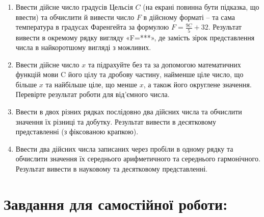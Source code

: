 \documentclass[a5paper,titlepage,openany,twoside,draft]{book_unv}%
\begin{document}
\begin{enumerate}
\item
Ввести дійсне число градусів Цельсія $C$ (на екрані повинна бути
підказка, що ввести) та обчислити й вивести число $F$ в дійсному форматі
-- та сама температура в градусах Фаренгейта за формулою $F = \frac{9C}{5} + 32 $.
Результат вивести в окремому рядку вигляду «F=***», де замість зірок представлення числа в найкоротшому вигляді
з можливих.

\item
Ввести дійсне число $x$ та підрахуйте без та за допомогою математичних
функцій мови C його цілу та дробову частину, найменше ціле число, що більше
$x$ та найбільше ціле, що менше $x$, а також його округлене значення.
Перевірте результат роботи для від'ємного числа.
\item
Ввести в двох різних рядках послідовно два дійсних числа та обчислити
значення їх різниці та добутку. Результат вивести в десятковому
представленні (з фіксованою крапкою).
\item
Ввести два дійсних числа записаних через пробіли в одному рядку та
обчислити значення їх середнього арифметичного та середнього
гармонічного. Результат вивести в науковому та десятковому
представленні.
\end{enumerate}

\section{Завдання для самостійної роботи:}
\end{document}
